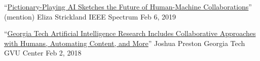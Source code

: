   \cvmedia
    {``\href{https://spectrum.ieee.org/pictionary-playing-ai-sketches-the-future-of-human-machine-collaborations}{Pictionary-Playing AI Sketches the Future of Human-Machine Collaborations}'' (mention)} %
    {Eliza Strickland} %
    {IEEE Spectrum} %
    {Feb 6, 2019} %


  \cvmedia
    {``\href{https://web.archive.org/web/20220512160546/https://gvu.gatech.edu/georgia-tech-aaai2018}{Georgia Tech Artificial Intelligence Research Includes Collaborative Approaches with Humans, Automating Content, and More}''} %
    {Joshua Preston} %
    {Georgia Tech GVU Center} %
    {Feb 2, 2018} %




